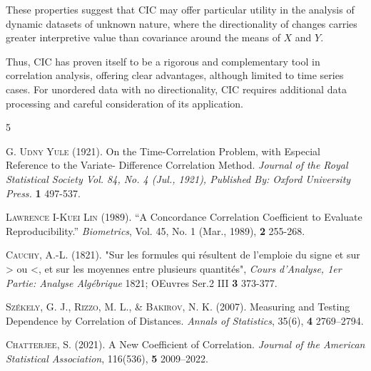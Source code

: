 \documentclass[qe,nameyear,draft]{econsocart}
\newcommand{\cic}{\text{CIC}}
\begin{document}
These properties suggest that $\cic$ may offer particular utility in the analysis of dynamic datasets of unknown nature, where the directionality of changes carries greater interpretive value than covariance around the means of $X$ and $Y$.

Thus, $\cic$ has proven itself to be a rigorous and complementary tool in correlation analysis, offering clear advantages, although limited to time series cases. For unordered data with no directionality, $\cic$ requires additional data processing and careful consideration of its application.


\begin{thebibliography}{5}


\textsc{G. Udny Yule} (1921).
On the Time-Correlation Problem, with Especial Reference to the Variate- Difference Correlation Method.
\textit{Journal of the Royal Statistical Society Vol. 84, No. 4 (Jul., 1921), Published By: Oxford University Press.}
\textbf{1} 497-537.


\textsc{Lawrence I-Kuei Lin} (1989). “A Concordance Correlation Coefficient to Evaluate Reproducibility.” \textit{Biometrics}, Vol. 45, No. 1 (Mar., 1989),
\textbf{2} 255-268.

\textsc{Cauchy, A.-L.} (1821). "Sur les formules qui résultent de l'emploie du signe et sur > ou <, et sur les moyennes entre plusieurs quantités", \textit{Cours d'Analyse, 1er Partie: Analyse Algébrique} 1821; OEuvres Ser.2 III
\textbf{3} 373-377.

\textsc{Székely, G. J., Rizzo, M. L., \& Bakirov, N. K.} (2007). Measuring and Testing Dependence by Correlation of Distances. \textit{Annals of Statistics}, 35(6),
\textbf{4} 2769–2794.

\textsc{Chatterjee, S.} (2021). A New Coefficient of Correlation. \textit{Journal of the American Statistical Association}, 116(536),
\textbf{5} 2009–2022.
\end{thebibliography}
\end{document}
